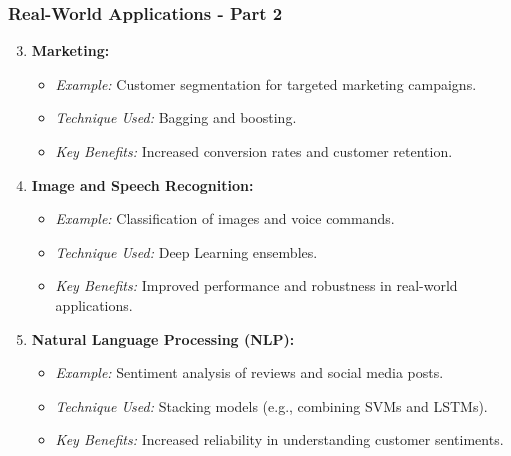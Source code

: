 \documentclass[aspectratio=169]{beamer}
\begin{document}
\begin{frame}[fragile]
    \frametitle{Real-World Applications - Part 2}
    \begin{enumerate}
        \setcounter{enumi}{2}
        \item \textbf{Marketing:}
        \begin{itemize}
            \item \textit{Example:} Customer segmentation for targeted marketing campaigns.
            \item \textit{Technique Used:} Bagging and boosting.
            \item \textit{Key Benefits:} Increased conversion rates and customer retention.
        \end{itemize}

        \item \textbf{Image and Speech Recognition:}
        \begin{itemize}
            \item \textit{Example:} Classification of images and voice commands.
            \item \textit{Technique Used:} Deep Learning ensembles.
            \item \textit{Key Benefits:} Improved performance and robustness in real-world applications.
        \end{itemize}

        \item \textbf{Natural Language Processing (NLP):}
        \begin{itemize}
            \item \textit{Example:} Sentiment analysis of reviews and social media posts.
            \item \textit{Technique Used:} Stacking models (e.g., combining SVMs and LSTMs).
            \item \textit{Key Benefits:} Increased reliability in understanding customer sentiments.
        \end{itemize}
    \end{enumerate}
\end{frame}
\end{document}
